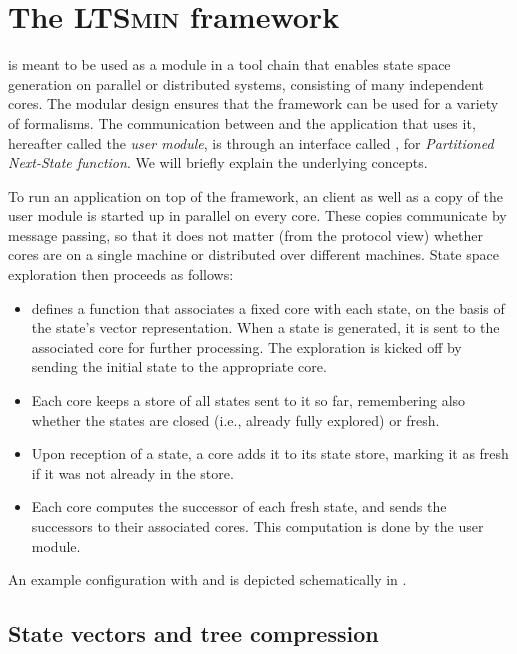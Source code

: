 \section{The \textsc{\bfseries LTSmin} framework}

\LTSMIN is meant to be used as a module in a tool chain that enables state
space generation on parallel or distributed systems, consisting of many
independent cores. The modular design ensures that the framework can be used
for a variety of formalisms. The communication between \LTSMIN and the
application that uses it, hereafter called the \emph{user module}, is through an interface called \PINS, for \emph{Partitioned
  Next-State function}. We will briefly explain the underlying concepts.

To run an application on top of the \LTSMIN framework, an \LTSMIN client as
well as a copy of the user module is started up in parallel on every
core. These copies communicate by message passing, so that it does not
matter (from the protocol view) whether cores are on a single machine or
distributed over different machines. State space exploration then proceeds as
follows:

\begin{itemize}\noitemsep
\item \LTSMIN defines a function that associates a fixed core with each state,
  on the basis of the state's vector representation. When a state is generated,
  it is sent to the associated core for further processing. The exploration is
  kicked off by sending the initial state to the appropriate core.
\item Each core keeps a store of all states sent to it so far, remembering also
  whether the states are closed (i.e., already fully explored) or fresh.
\item Upon reception of a state, a core adds it to its state store, marking it
  as fresh if it was not already in the store.
\item Each core computes the successor of each fresh state, and sends the
  successors to their associated cores. This computation is done by the user
  module.
\end{itemize}%
%
An example configuration with
\GROOVE and \BLISS is depicted schematically in .


\subsection{State vectors and tree compression}

